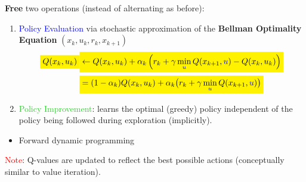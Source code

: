 \begin{tcolorbox}[colframe=purple!50!black, colback=purple!5!white, title=Q-Learning (conceptually similar to Value Iteration)]
\textbf{Free} two operations (instead of alternating as before):
\begin{enumerate}
    \item \textcolor{blue}{Policy Evaluation} via \textcolor{BurntOrange}{stochastic approximation} of the \textbf{Bellman Optimality Equation} $(x_k, u_k, r_k, x_{k+1})$
    \begin{align*}
        \stabilo{Q(x_k, u_k)} &\stabilo{\gets Q(x_k, u_k) + \alpha_k \left( r_k + \gamma \min_{\color{blue}u} Q(x_{k+1}, {\color{blue}u}) - Q(x_k, u_k) \right)} \\
        &\stabilo{= (1 - \alpha_k) Q(x_k, u_k) + \alpha_k \big( r_k + \gamma \min_{\color{blue}u} Q(x_{k+1}, {\color{blue}u}) \big)}
    \end{align*}
    
    \item \textcolor{LimeGreen}{Policy Improvement}: learns the optimal (greedy) policy independent of the policy being followed during exploration (implicitly).
\end{enumerate}
\begin{itemize}
    \item Forward dynamic programming
\end{itemize}
\textcolor{red}{Note}: Q-values are updated to reflect the best possible actions (conceptually similar to value iteration).
\end{tcolorbox}

